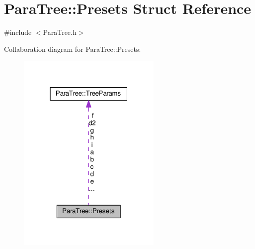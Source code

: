 \hypertarget{struct_para_tree_1_1_presets}{}\section{Para\+Tree\+:\+:Presets Struct Reference}
\label{struct_para_tree_1_1_presets}


{\ttfamily \#include $<$Para\+Tree.\+h$>$}



Collaboration diagram for Para\+Tree\+:\+:Presets\+:\nopagebreak
\begin{figure}[H]
\begin{center}
\leavevmode
\includegraphics[width=196pt]{struct_para_tree_1_1_presets__coll__graph}
\end{center}
\end{figure}
